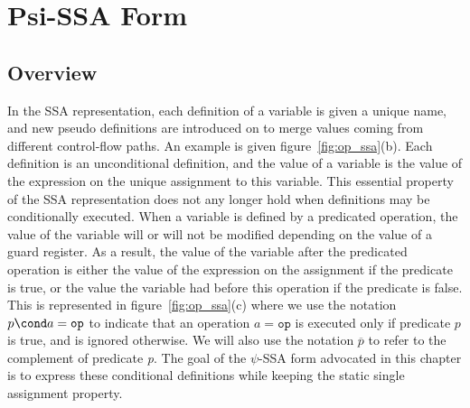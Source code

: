\chapter{Psi-SSA Form }
\label{chapter:psi_ssa}

\section{Overview}



In the SSA representation, each definition of a variable is given a
unique name, and new pseudo definitions are introduced on \phifuns to merge values coming from different control-flow paths. An
example is given figure~\ref{fig:op_ssa}(b). Each definition is an
unconditional definition, and the value of a variable is the value of
the expression on the unique assignment to this variable. This
essential property of the SSA representation does not any longer hold
when definitions may be conditionally executed. When a variable is defined by a predicated operation, the value of the variable
will or will not be modified depending on the value of a guard
register. As a result, the value of the variable after the predicated
operation is either the value of the expression on the assignment if
the predicate is true, or the value the variable had before this
operation if the predicate is false. This is represented in
figure~\ref{fig:op_ssa}(c) where we use the notation $p\cond a = \texttt{op}$ to indicate that an operation $a = \texttt{op}$ is executed only if predicate $p$ is true, and is ignored otherwise. We will also use the notation $\overline{{p}}$ to refer to the complement of predicate \textit{p}.
The goal of the $\psi$-SSA form advocated in this chapter is to express these conditional definitions while keeping the static single assignment property.

